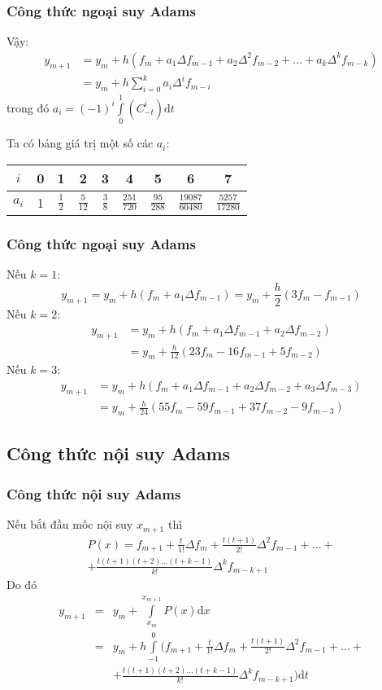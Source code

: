 	\begin{frame}
	\frametitle{Công thức ngoại suy Adams}
	Vậy:
	\begin{align*}
		y_{m+1}&=y_m+h\left(f_m+a_1\Delta f_{m-1}+a_2\Delta^2 f_{m-2}+\ldots+a_k\Delta^k f_{m-k}\right)\\
		       &=y_m+h\sum_{i=0}^k a_i\Delta^i f_{m-i}
	\end{align*}
	trong đó $a_i=(-1)^i\int\limits_{0}^{1}\left(C_{-t}^i\right)\mathrm{d}t$

	Ta có bảng giá trị một số các $a_i$:
	\begin{table}\begin{tabular}{|c|c|c|c|c|c|c|c|c|}\hline
		$i$&0&1&2&3&4&5&6&7\\
		\hline\tabularrowheight{24pt}
		$a_i$&1&$\frac{1}{2}$&$\frac{5}{12}$&$\frac{3}{8}$&$\frac{251}{720}$&$\frac{95}{288}$&$\frac{19087}{60480}$&$\frac{5257}{17280}$\\
		\hline
	\end{tabular}\end{table}
\end{frame}

\begin{frame}
	\frametitle{Công thức ngoại suy Adams}
	Nếu $k=1$:
	$$y_{m+1}=y_m+h\left(f_m+a_1\Delta f_{m-1}\right)=y_m+\frac{h}{2}\left(3f_m-f_{m-1}\right)$$
	Nếu $k=2$:
	\begin{align*}
		y_{m+1}&=y_m+h\left(f_m+a_1\Delta f_{m-1}+a_2\Delta f_{m-2}\right)\\
		       &=y_m+\frac{h}{12}\left(23f_m-16f_{m-1}+5f_{m-2}\right)
	\end{align*}
	Nếu $k=3$:
	\begin{align*}
		y_{m+1}&=y_m+h\left(f_m+a_1\Delta f_{m-1}+a_2\Delta f_{m-2}+a_3\Delta f_{m-3}\right)\\
		       &=y_m+\frac{h}{24}\left(55f_m-59f_{m-1}+37f_{m-2}-9f_{m-3}\right)
	\end{align*}
\end{frame}

\begin{frame}
	\subsection{Công thức nội suy Adams}
	\frametitle{Công thức nội suy Adams}
	Nếu bắt đầu mốc nội suy $x_{m+1}$ thì
	\begin{multline*}
		P(x)=f_{m+1}+\frac{t}{1!}\Delta f_m+\frac{t(t+1)}{2!} \Delta^2 f_{m-1}+\ldots+\\
		+\frac{t(t+1)(t+2)\ldots(t+k-1)}{k!} \Delta^k f_{m-k+1}
	\end{multline*}
	Do đó
	$$\begin{array}{rcl}
		y_{m+1} & = & y_m+\int\limits_{x_m}^{x_{m+1}} P(x)\mathrm{d}x\\
		        & = & y_m+h\int\limits_{-1}^{0}\bigg(f_{m+1}+\frac{t}{1!}\Delta f_m+\frac{t(t+1)}{2!} \Delta^2 f_{m-1}+\ldots+\\
		        &   &+\frac{t(t+1)(t+2)\ldots(t+k-1)}{k!} \Delta^k f_{m-k+1}\bigg)\mathrm{d}t
	\end{array}$$
\end{frame}

